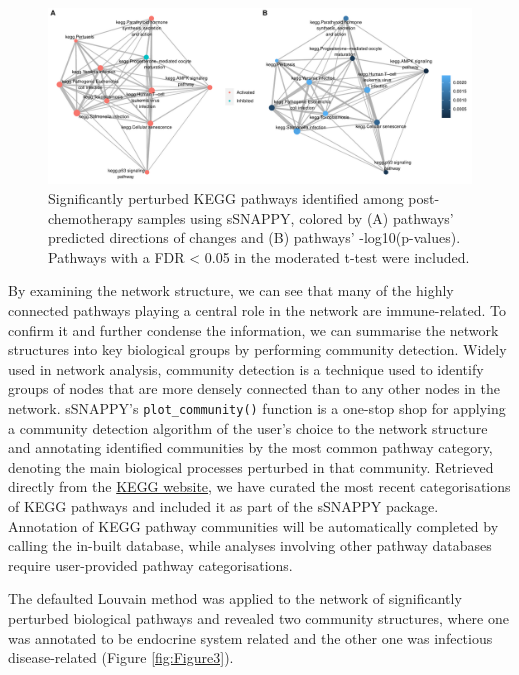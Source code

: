 \documentclass[9pt,a4paper,]{extarticle}
\begin{document}
\begin{figure}

{\centering \includegraphics[width=1\linewidth]{sSNAPPY_paper_files/figure-latex/Figure2-1} 

}

\caption{Significantly perturbed KEGG pathways identified among post-chemotherapy samples using sSNAPPY, colored by (A) pathways’ predicted directions of changes and (B) pathways’ -log10(p-values). Pathways with a FDR < 0.05 in the moderated t-test were included.}\label{fig:Figure2}
\end{figure}

By examining the network structure, we can see that many of the highly connected pathways playing a central role in the network are immune-related. To confirm it and further condense the information, we can summarise the network structures into key biological groups by performing community detection. Widely used in network analysis, community detection is a technique used to identify groups of nodes that are more densely connected than to any other nodes in the network\citep{Newman2004}. sSNAPPY's \texttt{plot\_community()} function is a one-stop shop for applying a community detection algorithm of the user's choice to the network structure and annotating identified communities by the most common pathway category, denoting the main biological processes perturbed in that community. Retrieved directly from the \href{https://www.genome.jp/kegg/pathway.html}{KEGG website}, we have curated the most recent categorisations of KEGG pathways and included it as part of the sSNAPPY package. Annotation of KEGG pathway communities will be automatically completed by calling the in-built database, while analyses involving other pathway databases require user-provided pathway categorisations.

The defaulted Louvain method was applied to the network of significantly perturbed biological pathways and revealed two community structures, where one was annotated to be endocrine system related and the other one was infectious disease-related (Figure \ref{fig:Figure3}).
\end{document}
